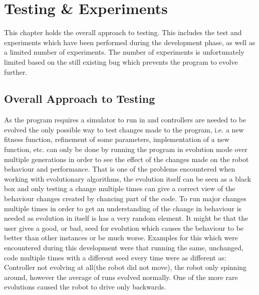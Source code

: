 \chapter{Testing \& Experiments}
This chapter holds the overall approach to testing. 
This includes the test and experiments which have been performed during the development phase, as well as a limited number of experiments. 
The number of experiments is unfortunately limited based on the still existing bug which prevents the program to evolve further. 

\section{Overall Approach to Testing}
As the program requires a simulator to run in and controllers are needed to be evolved the only possible way to test changes made to the program, i.e. a new fitness function, refinement of some parameters, implementation of a new function, etc. can only be done by running the program in evolution mode over multiple generations in order to see the effect of the changes made on the robot behaviour and performance.
That is one of the problems encountered when working with evolutionary algorithms, the evolution itself can be seen as a black box and only testing a change multiple times can give a correct view of the behaviour changes created by chancing part of the code. To run major changes multiple times in order to get an understanding of the change in behaviour is needed as evolution in itself is has a very random element.
It might be that the user gives a good, or bad, seed for evolution which causes the behaviour to be better than other instances or be much worse. 
Examples for this which were encountered during this development were that running the same, unchanged, code multiple times with a different seed every time were as different as: Controller not evolving at all(the robot did not move), the robot only spinning around, however the average of runs evolved normally. 
One of the more rare evolutions caused the robot to drive only backwards. \\

